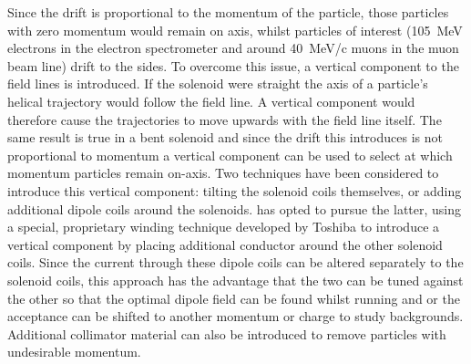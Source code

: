 Since the drift is proportional to the momentum of the particle, those particles with zero momentum would remain on axis, whilst particles of interest (105~MeV electrons in the \phaseII electron spectrometer and around 40~MeV/c muons in the muon beam line) drift to the sides.  
To overcome this issue, a vertical component to the field lines is introduced.  
If the solenoid were straight the axis of a particle's helical trajectory would follow the field line. 
A vertical component would therefore cause the trajectories to move upwards with the field line itself.
The same result is true in a bent solenoid and since the drift this introduces is not proportional to momentum a vertical component can be used to select at which momentum particles remain on-axis.
Two techniques have been considered to introduce this vertical component: tilting the solenoid coils themselves, or adding additional dipole coils around the solenoids.
\COMET has opted to pursue the latter, using a special, proprietary winding technique developed by Toshiba to introduce a vertical component by placing additional conductor around the other solenoid coils.
Since the current through these dipole coils can be altered separately to the solenoid coils, this approach has the advantage that the two can be tuned against the other so that the optimal dipole field can be found whilst running and or the acceptance can be shifted to another momentum or charge to study backgrounds.
Additional collimator material can also be introduced to remove particles with undesirable momentum.

